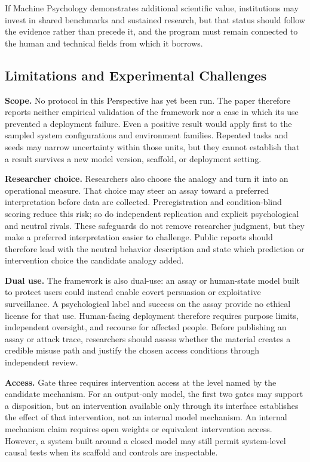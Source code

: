 \documentclass{article}
\begin{document}
If Machine Psychology demonstrates additional scientific value, institutions may invest in shared benchmarks and sustained research, but that status should follow the evidence rather than precede it, and the program must remain connected to the human and technical fields from which it borrows.

\subsection{Limitations and Experimental Challenges}\label{sec:limitations}
\textbf{Scope.} No protocol in this Perspective has yet been run. The paper therefore reports neither empirical validation of the framework nor a case in which its use prevented a deployment failure. Even a positive result would apply first to the sampled system configurations and environment families. Repeated tasks and seeds may narrow uncertainty within those units, but they cannot establish that a result survives a new model version, scaffold, or deployment setting.

\textbf{Researcher choice.} Researchers also choose the analogy and turn it into an operational measure. That choice may steer an assay toward a preferred interpretation before data are collected. Preregistration and condition-blind scoring reduce this risk; so do independent replication and explicit psychological and neutral rivals. These safeguards do not remove researcher judgment, but they make a preferred interpretation easier to challenge. Public reports should therefore lead with the neutral behavior description and state which prediction or intervention choice the candidate analogy added.

\textbf{Dual use.} The framework is also dual-use: an assay or human-state model built to protect users could instead enable covert persuasion or exploitative surveillance. A psychological label and success on the assay provide no ethical license for that use. Human-facing deployment therefore requires purpose limits, independent oversight, and recourse for affected people. Before publishing an assay or attack trace, researchers should assess whether the material creates a credible misuse path and justify the chosen access conditions through independent review.

\textbf{Access.} Gate three requires intervention access at the level named by the candidate mechanism. For an output-only model, the first two gates may support a disposition, but an intervention available only through its interface establishes the effect of that intervention, not an internal model mechanism. An internal mechanism claim requires open weights or equivalent intervention access. However, a system built around a closed model may still permit system-level causal tests when its scaffold and controls are inspectable.
\end{document}
